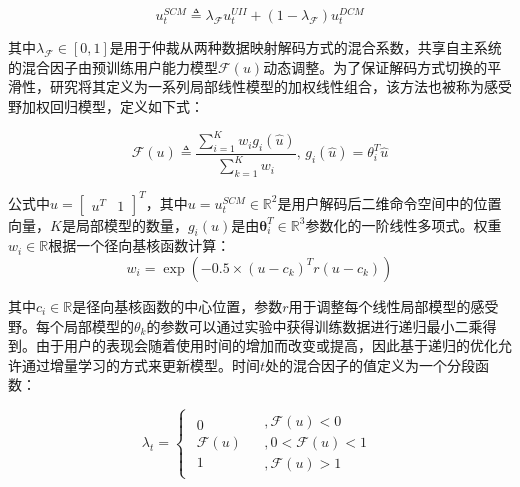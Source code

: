 \begin{equation}
    \label{ex6}
    u_t^{SCM}\triangleq \lambda_{\mathcal{F}} u_t^{UII}+(1-\lambda_{\mathcal{F}})u_t^{DCM}
\end{equation}   

其中$\lambda_{\mathcal{F}}  \in [0,1]$是用于仲裁从两种数据映射解码方式的混合系数，共享自主系统的混合因子由预训练用户能力模型$\mathcal{F}(u)$动态调整。为了保证解码方式切换的平滑性，研究将其定义为一系列局部线性模型的加权线性组合，该方法也被称为感受野加权回归模型\cite{schaalScalableTechniquesNonparametric2002}，定义如下式：

\begin{equation}
    \label{ex7}
    \mathcal{F} (u) \triangleq \frac{{\sum\nolimits_{i = 1}^K {{w_i}{g_i}(\hat u)} }}{{\sum\nolimits_{k = 1}^K {{w_i}} }}{\text{,  }}{g_i}(\hat u) = {\theta}_i^T{\hat u}
\end{equation}

公式中$\hat u = {[\begin{array}{*{20}{c}}{{u^T}}&1\end{array}]^T}$，其中${u} = u_t^{SCM}\in {\mathbb{R}^2}$是用户解码后二维命令空间中的位置向量，$K$是局部模型的数量，${g_i}(u)$是由${\boldsymbol{\theta }}_i^T \in {\mathbb{R}^{3}}$参数化的一阶线性多项式。权重${w_i\in {\mathbb{R}}}$根据一个径向基核函数计算：
\begin{equation}
    \label{ex8}
    {w_i} = \exp \left( { - 0.5 \times {{(u - {{c}_k})}^T}{{r}}(u - {c_k})} \right)
\end{equation}

其中$c_i \in \mathbb{R}$是径向基核函数的中心位置，参数$r$用于调整每个线性局部模型的感受野。每个局部模型的${\theta }_k$的参数可以通过实验中获得训练数据进行递归最小二乘得到。由于用户的表现会随着使用时间的增加而改变或提高，因此基于递归的优化允许通过增量学习的方式来更新模型。时间$t$处的混合因子的值定义为一个分段函数：

\begin{equation}
    \label{ex9}
    {\lambda _t} = \left \{{\begin{array}{*{20}{c}}
        {\begin{array}{*{20}{c}}
        0  \\  
        {\mathcal{F} (u)}  \\  
        1 
      \end{array}}&{\begin{array}{*{20}{c}}
        {,\mathcal{F} (u) < 0}  \\  
        {,0 < \mathcal{F} (u) < 1}  \\  
        {,\mathcal{F} (u) > 1} 
      \end{array}} 
      \end{array}} \right.
\end{equation}


